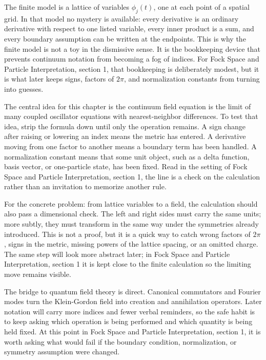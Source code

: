 The finite model is a lattice of variables \(\phi_j(t)\), one at each point of a spatial grid.  In that model no mystery is available: every derivative is an ordinary derivative with respect to one listed variable, every inner product is a sum, and every boundary assumption can be written at the endpoints.  This is why the finite model is not a toy in the dismissive sense.  It is the bookkeeping device that prevents continuum notation from becoming a fog of indices.  For Fock Space and Particle Interpretation, section 1, that bookkeeping is deliberately modest, but it is what later keeps signs, factors of \(2\pi\), and normalization constants from turning into guesses.

The central idea for this chapter is the continuum field equation is the limit of many coupled oscillator equations with nearest-neighbor differences.  To test that idea, strip the formula down until only the operation remains.  A sign change after raising or lowering an index means the metric has entered.  A derivative moving from one factor to another means a boundary term has been handled.  A normalization constant means that some unit object, such as a delta function, basis vector, or one-particle state, has been fixed.  Read in the setting of Fock Space and Particle Interpretation, section 1, the line is a check on the calculation rather than an invitation to memorize another rule.

For the concrete problem: from lattice variables to a field, the calculation should also pass a dimensional check.  The left and right sides must carry the same units; more subtly, they must transform in the same way under the symmetries already introduced.  This is not a proof, but it is a quick way to catch wrong factors of \(2\pi\), signs in the metric, missing powers of the lattice spacing, or an omitted charge.  The same step will look more abstract later; in Fock Space and Particle Interpretation, section 1 it is kept close to the finite calculation so the limiting move remains visible.

The bridge to quantum field theory is direct.  Canonical commutators and Fourier modes turn the Klein-Gordon field into creation and annihilation operators.  Later notation will carry more indices and fewer verbal reminders, so the safe habit is to keep asking which operation is being performed and which quantity is being held fixed.  At this point in Fock Space and Particle Interpretation, section 1, it is worth asking what would fail if the boundary condition, normalization, or symmetry assumption were changed.

